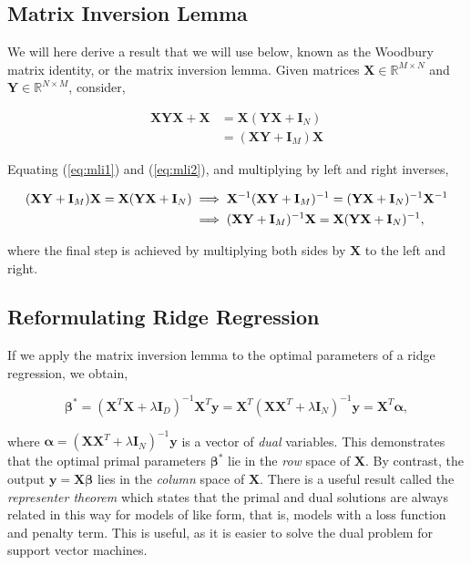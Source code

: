 \documentclass[11pt]{amsart}
\begin{document}
\subsection{Matrix Inversion Lemma}

We will here derive a result that we will use below, known as the Woodbury matrix identity, or the matrix inversion lemma. Given matrices $\mathbf{X} \in \mathbb{R}^{M\times N}$ and $\mathbf{Y} \in \mathbb{R}^{N\times M}$, consider,

\begin{align}
\mathbf{X}\mathbf{Y}\mathbf{X} + \mathbf{X} &= \mathbf{X}(\mathbf{Y}\mathbf{X} + \mathbf{I}_N) \label{eq:mli1} \\
&= (\mathbf{X}\mathbf{Y} + \mathbf{I}_M)\mathbf{X} \label{eq:mli2}
\end{align}

Equating (\ref{eq:mli1}) and (\ref{eq:mli2}), and multiplying by left and right inverses,

\begin{align}
(\mathbf{X}\mathbf{Y} + \mathbf{I}_M)\mathbf{X} = \mathbf{X}(\mathbf{Y}\mathbf{X} + \mathbf{I}_N) &\implies \mathbf{X}^{-1}(\mathbf{X}\mathbf{Y} + \mathbf{I}_M)^{-1} = (\mathbf{Y}\mathbf{X} + \mathbf{I}_N)^{-1}\mathbf{X}^{-1}\notag\\
&\implies (\mathbf{X}\mathbf{Y} + \mathbf{I}_M)^{-1}\mathbf{X} =  \mathbf{X}(\mathbf{Y}\mathbf{X} + \mathbf{I}_N)^{-1},\notag
\end{align}

where the final step is achieved by multiplying both sides by $\mathbf{X}$ to the left and right.

\subsection{Reformulating Ridge Regression}

If we apply the matrix inversion lemma to the optimal parameters of a ridge regression, we obtain,

$$\boldsymbol{\beta}^* = (\mathbf{X}^T\mathbf{X} + \lambda\mathbf{I}_D)^{-1}\mathbf{X}^T\mathbf{y} = \mathbf{X}^T(\mathbf{X}\mathbf{X}^T + \lambda\mathbf{I}_N)^{-1}\mathbf{y} = \mathbf{X}^T\boldsymbol\alpha,$$

where $\boldsymbol\alpha = (\mathbf{X}\mathbf{X}^T + \lambda\mathbf{I}_N)^{-1}\mathbf{y}$ is a vector of \emph{dual} variables. This demonstrates that the optimal primal parameters $\boldsymbol\beta^*$ lie in the \emph{row} space of $\mathbf{X}$. By contrast, the output $\mathbf{y} = \mathbf{X}\boldsymbol\beta$ lies in the \emph{column} space of $\mathbf{X}$. There is a useful result called the \emph{representer theorem} which states that the primal and dual solutions are always related in this way for models of like form, that is, models with a loss function and penalty term. This is useful, as it is easier to solve the dual problem for support vector machines.
\end{document}
